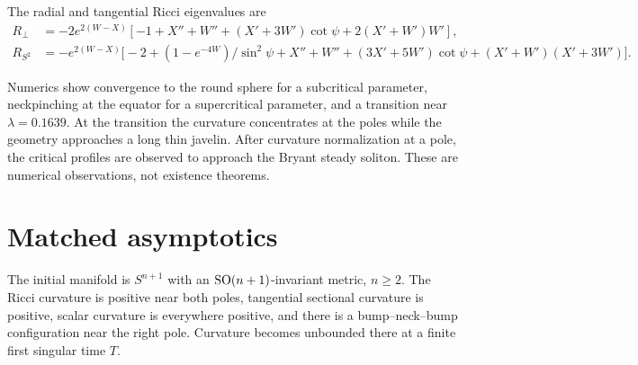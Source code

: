\begin{definition}
\label{def:chow-iv-rotational-ricci-eigenvalues}


The radial and tangential Ricci eigenvalues are
\begin{align*}
 R_\perp&=-2e^{2(W-X)}[-1+X''+W''+(X'+3W')\cot\psi+2(X'+W')W'],\\
 R_{S^2}&=-e^{2(W-X)}\bigl[-2+(1-e^{-4W})/\sin^2\psi+X''+W''
 +(3X'+5W')\cot\psi +(X'+W')(X'+3W')\bigr].
\end{align*}
\end{definition}

\begin{remark}
\label{rem:chow-iv-numerical-phase-transition}


Numerics show convergence to the round sphere for a subcritical parameter,
neckpinching at the equator for a supercritical parameter, and a transition
near $\lambda=0.1639$.  At the transition the curvature concentrates at the
poles while the geometry approaches a long thin javelin.  After curvature
normalization at a pole, the critical profiles are observed to approach the
Bryant steady soliton.  These are numerical observations, not existence
theorems.
\end{remark}

\section{Matched asymptotics}

\begin{definition}
\label{def:chow-iv-primary-degenerate-neckpinch-ansatz}

The initial manifold is $S^{n+1}$ with an $\operatorname{SO}(n+1)$-invariant metric,
$n\ge2$.  The Ricci curvature is positive near both poles, tangential
sectional curvature is positive, scalar curvature is everywhere positive, and
there is a bump--neck--bump configuration near the right pole.  Curvature
becomes unbounded there at a finite first singular time $T$.
\end{definition}

